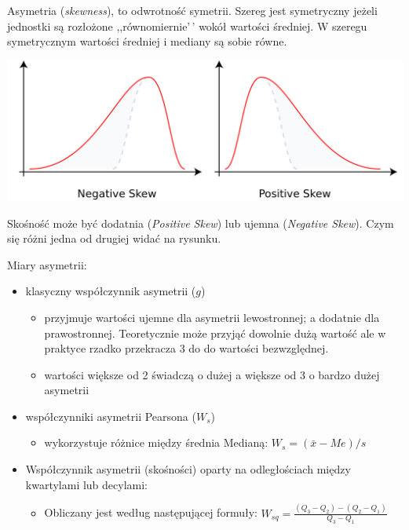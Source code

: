 \documentclass[
  openany]{book}
\providecommand{\tightlist}{%
  \setlength{\itemsep}{0pt}\setlength{\parskip}{0pt}}
\begin{document}
Asymetria (\emph{skewness}), to odwrotność symetrii. Szereg jest symetryczny
jeżeli jednostki są rozłożone ,,równomiernie'\,' wokół wartości średniej.
W szeregu symetrycznym wartości średniej i mediany są sobie równe.

\includegraphics{./Negative_and_positive_skew.png}

Skośność może być dodatnia (\emph{Positive Skew}) lub ujemna (\emph{Negative Skew}). Czym się różni jedna
od drugiej widać na rysunku.

Miary asymetrii:

\begin{itemize}
\item
  klasyczny współczynnik asymetrii (\(g\))

  \begin{itemize}
  \tightlist
  \item
    przyjmuje wartości ujemne dla asymetrii lewostronnej; a dodatnie
    dla prawostronnej. Teoretycznie może przyjąć dowolnie dużą wartość
    ale w praktyce rzadko przekracza 3 do do wartości bezwzględnej.
  \item
    wartości większe od 2 świadczą o dużej a większe od 3 o bardzo dużej
    asymetrii
  \end{itemize}
\item
  współczynniki asymetrii Pearsona (\(W_s\))

  \begin{itemize}
  \tightlist
  \item
    wykorzystuje różnice między średnia Medianą: \(W_s = (\bar x - Me)/s\)
  \end{itemize}
\item
  Współczynnik asymetrii (skośności) oparty na odległościach
  między kwartylami lub decylami:

  \begin{itemize}
  \tightlist
  \item
    Obliczany jest według następującej
    formuły: \(W_{sq} = \frac{(Q_3 - Q_2) - (Q_2 - Q_1)}{Q_3 - Q_1}\)
  \end{itemize}
\end{itemize}
\end{document}
